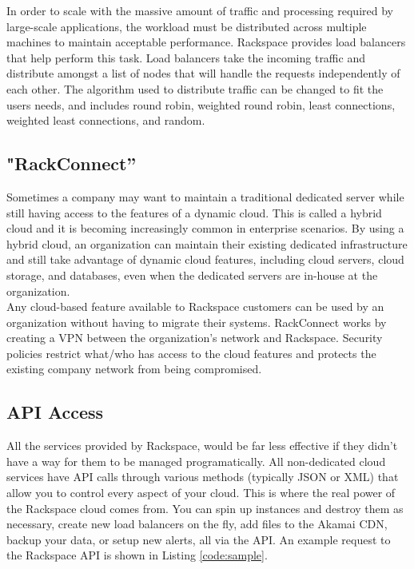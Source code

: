 \documentclass[DIV=calc, paper=letter, fontsize=12pt, twocolumn]{scrartcl}	 %
\begin{document}
In order to scale with the massive amount of traffic and processing
required by large-scale applications, the workload must be distributed
across multiple machines to maintain acceptable performance. Rackspace
provides load balancers that help perform this task. Load balancers
take the incoming traffic and distribute amongst a list of nodes that
will handle the requests independently of each other. The algorithm
used to distribute traffic can be changed to fit the users needs, and
includes round robin, weighted round robin, least connections, weighted
least connections, and random.

\subsection*{"RackConnect''}

Sometimes a company may want to maintain a traditional dedicated server
while still having access to the features of a dynamic cloud. This is
called a hybrid cloud and it is becoming increasingly common in enterprise
scenarios. By using a hybrid cloud, an organization can maintain their
existing dedicated infrastructure and still take advantage of dynamic
cloud features, including cloud servers, cloud storage, and databases,
even when the dedicated servers are in-house at the organization.
\\

Any cloud-based feature available to Rackspace customers can be used
by an organization without having to migrate their systems. RackConnect 
works by creating a VPN between the organization's network and Rackspace.
Security policies restrict what/who has access to the cloud features
and protects the existing company network from being compromised.

\subsection*{API Access}

All the services provided by Rackspace, would be far less effective if 
they didn't have a way for them to be managed programatically. All 
non-dedicated cloud services have API calls through various methods
(typically JSON or XML) that allow you to control every aspect of 
your cloud. This is where the real power of the Rackspace cloud
comes from. You can spin up instances and destroy them as necessary,
create new load balancers on the fly, add files to the Akamai CDN, 
backup your data, or setup new alerts, all via the API. An example request
to the Rackspace API is shown in Listing \ref{code:sample}.
\end{document}
